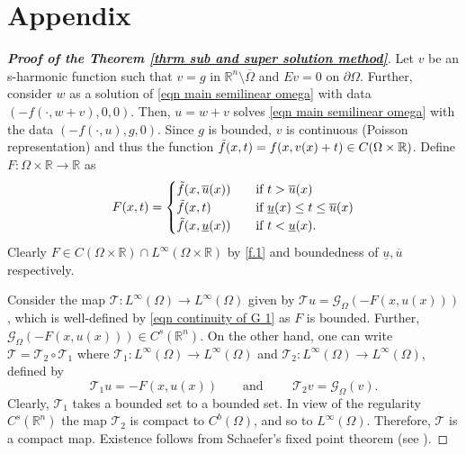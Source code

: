 \documentclass{amsart}
\newcommand{\R}{\mathbb{R}}
\newcommand{\rn}{\mathbb{R}^{n}}
\newcommand{\g}[1]{\mathcal{G}_{#1}}
\begin{document}
\section{Appendix}\label{section appendix}
\begin{proof}[\textbf{Proof of the Theorem \ref{thrm sub and super solution method}}]
Let $v$ be an s-harmonic function such that $v=g$ in $\R^{n}\setminus\overline{\Omega}$ and $Ev=0$ on $\partial\Omega$. Further, consider $w$ as a solution of \eqref{eqn main semilinear omega} with data $(-f(\cdot,w+v), 0,0)$. 
 Then, $u=w+v$ solves \eqref{eqn main semilinear omega} with the data $(-f(\cdot,u),g,0)$. Since $g$ is bounded, $v$ is continuous (Poisson representation) and thus the function $\Tilde{f}(x,t)=f(x,v(x)+t)\in C(\Omega\times \R)$.
 Define $F:\Omega\times\R\to\R$ as 
 \begin{equation*}
     F(x,t)=\begin{cases}
         \Tilde{f}(x,\overline{u}(x)) \quad &\text{if }t >\overline{u}(x) \\
         \Tilde{f}(x,t) &\text{if } \underline{u}(x)\leq t\leq \overline{u}(x)\\
         \Tilde{f}(x,\underline{u}(x)) &\text{if } t<\underline{u}(x).
     \end{cases}
 \end{equation*}
 Clearly $F\in C(\Omega\times \R)\cap L^{\infty}(\Omega\times \R)$ by \eqref{f.1} and boundedness of $\underline{u},\overline{u}$ respectively.

 
Consider the map $\mathcal{T}:L^{\infty}(\Omega)\to L^{\infty}(\Omega)$ given by $\mathcal{T}u=\g{\Omega}\left(-F(x,u(x))\right)$, which is well-defined by \eqref{eqn continuity of G 1} as $F$ is bounded. 
 Further,  $\g{\Omega}\left(-F(x,u(x))\right)\in C^{s}(\rn)$. On the other hand, one can write $\mathcal{T}=\mathcal{T}_{2}\circ\mathcal{T}_{1}$ where $\mathcal{T}_{1}:L^{\infty}(\Omega)\to L^{\infty}(\Omega)$ and $\mathcal{T}_{2}:L^{\infty}(\Omega)\to L^{\infty}(\Omega)$, defined by 
 \begin{equation*}
     \mathcal{T}_{1}u=-F\left(x,u(x)\right) \quad\quad \text{and } \quad \quad\mathcal{T}_{2}v=\g{\Omega}(v).
 \end{equation*}
 Clearly, $\mathcal{T}_{1}$ takes a bounded set to a bounded set. In view of the regularity $C^{s}(\rn)$ the map $\mathcal{T}_{2}$ is compact to $C^{b}(\Omega)$, and so to $L^{\infty}(\Omega)$. Therefore, $\mathcal{T}$ is a compact map.
Existence follows from Schaefer's fixed point theorem (see \cite{EvansPDE2010}).


\end{proof}
\end{document}
